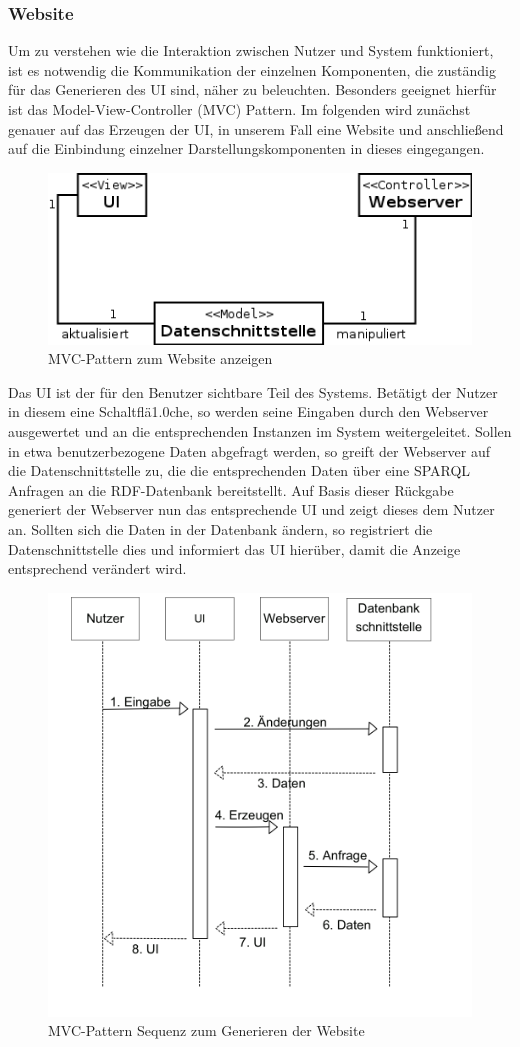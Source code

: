 

\subsubsection{Website}
\noindent Um zu verstehen wie die Interaktion zwischen Nutzer und System funktioniert, ist es notwendig die Kommunikation der einzelnen Komponenten, die zuständig für das Generieren des UI sind, näher zu beleuchten. 
Besonders geeignet hierfür ist das Model-View-Controller (MVC) Pattern. 
Im folgenden wird zunächst genauer auf das Erzeugen der UI, in unserem Fall eine Website und anschließend auf die Einbindung einzelner Darstellungskomponenten in dieses eingegangen. \pagebreak
\begin{figure}[h]
\centering
\includegraphics[width=0.8\linewidth]{Grafik/Diagramm/Pattern/MVC/Website/Kontextdiagramm.png}
\caption[MVC Website Klassen]{MVC-Pattern zum Website anzeigen}
\end{figure}
\noindent  Das UI ist der für den Benutzer sichtbare Teil des Systems. Betätigt der Nutzer in diesem eine Schaltflä1.0che, so werden seine Eingaben durch den Webserver ausgewertet und an die entsprechenden Instanzen im System weitergeleitet. Sollen in etwa benutzerbezogene Daten abgefragt werden, so greift der Webserver auf die Datenschnittstelle zu, die die entsprechenden Daten über eine SPARQL Anfragen an die RDF-Datenbank bereitstellt. Auf Basis dieser Rückgabe generiert der Webserver nun das entsprechende UI und  zeigt dieses dem Nutzer an.
Sollten sich die Daten in der Datenbank ändern, so registriert die Datenschnittstelle dies und informiert das UI hierüber, damit die Anzeige entsprechend verändert wird.
\begin{figure}[h]
\centering
\includegraphics[width=0.6\linewidth]{Grafik/Diagramm/Pattern/MVC/Website/Sequenzdiagramm.png}
\caption[MVC Website Sequenz]{MVC-Pattern Sequenz zum Generieren der Website}
\end{figure}


